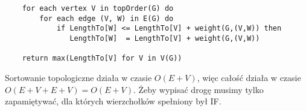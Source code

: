 \begin{lstlisting}
    for each vertex V in topOrder(G) do
        for each edge (V, W) in E(G) do
            if LengthTo[W] <= LengthTo[V] + weight(G,(V,W)) then
               LengthTo[W]  = LengthTo[V] + weight(G,(V,W))
 
    return max(LengthTo[V] for V in V(G))
\end{lstlisting}

Sortowanie topologiczne działa w czasie $O(E+V)$, więc całość działa w czasie $O(E+V+E+V) = O(E+V)$.
Żeby wypisać drogę musimy tylko zapamiętywać, dla których wierzchołków spełniony był IF.

